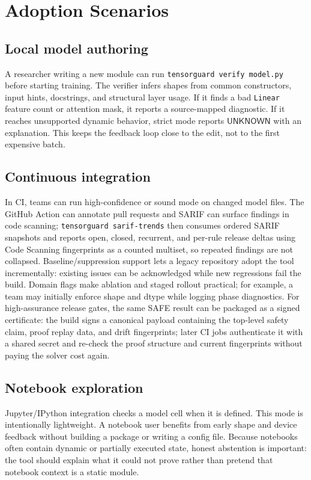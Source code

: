 \documentclass[11pt]{article}
\newcommand{\unknown}{\ensuremath{\mathsf{UNKNOWN}}}
\begin{document}
\section{Adoption Scenarios}

\subsection{Local model authoring}

A researcher writing a new module can run \texttt{tensorguard verify model.py}
before starting training.  The verifier infers shapes from common constructors,
input hints, docstrings, and structural layer usage.  If it finds a bad
\texttt{Linear} feature count or attention mask, it reports a source-mapped
diagnostic.  If it reaches unsupported dynamic behavior, strict mode reports
\unknown{} with an explanation.  This keeps the feedback loop close to the
edit, not to the first expensive batch.

\subsection{Continuous integration}

In CI, teams can run high-confidence or sound mode on changed model files.  The
GitHub Action can annotate pull requests and SARIF can surface findings in code
scanning; \texttt{tensorguard sarif-trends} then consumes ordered SARIF snapshots
and reports open, closed, recurrent, and per-rule release deltas using Code
Scanning fingerprints as a counted multiset, so repeated findings are not
collapsed.  Baseline/suppression support lets a legacy repository adopt the tool
incrementally: existing issues can be acknowledged while new regressions fail
the build.  Domain flags make ablation and staged rollout practical; for
example, a team may initially enforce shape and dtype while logging phase
diagnostics.  For high-assurance release gates, the same SAFE result can be
packaged as a signed certificate: the build signs a canonical payload containing
the top-level safety claim, proof replay data, and drift fingerprints; later CI
jobs authenticate it with a shared secret and re-check the proof structure and
current fingerprints without paying the solver cost again.

\subsection{Notebook exploration}

Jupyter/IPython integration checks a model cell when it is defined.  This mode
is intentionally lightweight.  A notebook user benefits from early shape and
device feedback without building a package or writing a config file.  Because
notebooks often contain dynamic or partially executed state, honest abstention
is important: the tool should explain what it could not prove rather than
pretend that notebook context is a static module.
\end{document}
